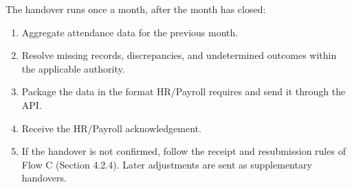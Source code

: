 {}

The handover runs once a month, after the month has closed:

\begin{enumerate}[leftmargin=36pt, itemsep=2pt, topsep=4pt, parsep=2pt]
  \item Aggregate attendance data for the previous month.
  \item Resolve missing records, discrepancies, and undetermined outcomes within the applicable authority.
  \item Package the data in the format HR/Payroll requires and send it through the API.
  \item Receive the HR/Payroll acknowledgement.
  \item If the handover is not confirmed, follow the receipt and resubmission rules of Flow C (Section 4.2.4). Later adjustments are sent as supplementary handovers.
\end{enumerate}
